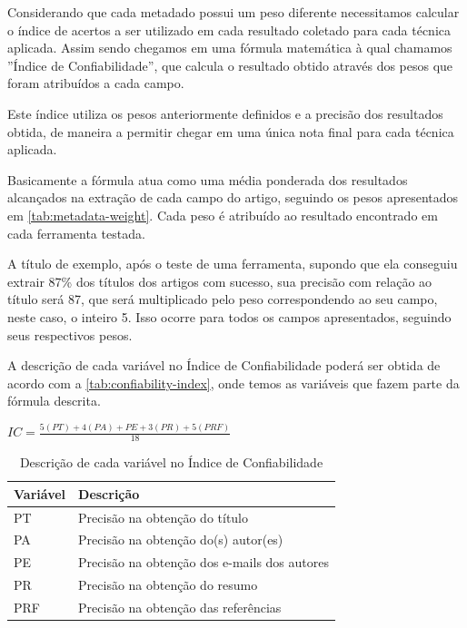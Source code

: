 
Considerando que cada metadado possui um peso diferente necessitamos calcular o índice de acertos a ser utilizado em cada resultado coletado para cada técnica aplicada. Assim sendo chegamos em uma fórmula matemática à qual chamamos ''Índice de Confiabilidade'', que calcula o resultado obtido através dos pesos que foram atribuídos a cada campo.

Este índice utiliza os pesos anteriormente definidos e a precisão dos resultados obtida, de maneira a permitir chegar em uma única nota final para cada técnica aplicada.

Basicamente a fórmula atua como uma média ponderada dos resultados alcançados na extração de cada campo do artigo, seguindo os pesos apresentados em \autoref{tab:metadata-weight}. Cada peso é atribuído ao resultado encontrado em cada ferramenta testada. 

A título de exemplo, após o teste de uma ferramenta, supondo que ela conseguiu extrair 87\% dos títulos dos artigos com sucesso, sua precisão com relação ao título será 87, que será multiplicado pelo peso correspondendo ao seu campo, neste caso, o inteiro 5. Isso ocorre para todos os campos apresentados, seguindo seus respectivos pesos.

A descrição de cada variável no Índice de Confiabilidade poderá ser obtida de acordo com a \autoref{tab:confiability-index}, onde temos as variáveis que fazem parte da fórmula descrita.

\begin{center}
	$ IC=\frac{5(PT)+4(PA)+PE+3(PR)+5(PRF)}{18} $
\end{center}

\begin{table}
    \caption{Descrição de cada variável no Índice de Confiabilidade}
    \begin{center}
    	\begin{tabular}{|p{3cm}|p{8cm}|}
			\hline \textbf{Variável} & \textbf{Descrição}\\ 
			\hline PT & Precisão na obtenção do título \\
			\hline PA & Precisão na obtenção do(s) autor(es)\\
			\hline PE & Precisão na obtenção dos e-mails dos autores \\
			\hline PR & Precisão na obtenção do resumo \\
			\hline PRF & Precisão na obtenção das referências \\
	    	\hline 
    	\end{tabular} 
    \end{center}
  	\label{tab:confiability-index}
\end{table}


